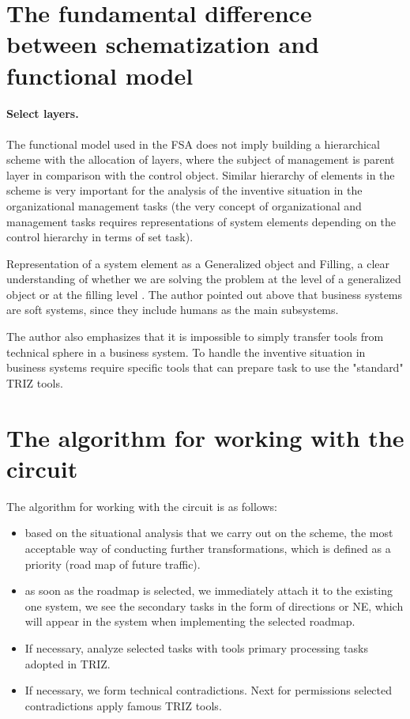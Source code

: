 \section{The fundamental difference between schematization and functional
  model}

\paragraph{Select layers.}
The functional model used in the FSA does not imply building a hierarchical
scheme with the allocation of layers, where the subject of management is
parent layer in comparison with the control object. Similar hierarchy of
elements in the scheme is very important for the analysis of the inventive
situation in the organizational management tasks (the very concept of
organizational and management tasks requires representations of system
elements depending on the control hierarchy in terms of set task).

Representation of a system element as a Generalized object and Filling, a
clear understanding of whether we are solving the problem at the level of a
generalized object or at the filling level . The author pointed out above that
business systems are soft systems, since they include humans as the main
subsystems.

The author also emphasizes that it is impossible to simply transfer tools from
technical sphere in a business system. To handle the inventive situation in
business systems require specific tools that can prepare task to use the
"standard" TRIZ tools.

\section{The algorithm for working with the circuit}
The algorithm for working with the circuit is as follows:
\begin{itemize}
\item based on the situational analysis that we carry out on the scheme, the
  most acceptable way of conducting further transformations, which is defined
  as a priority (road map of future traffic).
\item as soon as the roadmap is selected, we immediately attach it to the
  existing one system, we see the secondary tasks in the form of directions or
  NE, which will appear in the system when implementing the selected roadmap.
\item If necessary, analyze selected tasks with tools primary processing tasks
  adopted in TRIZ.
\item If necessary, we form technical contradictions. Next for permissions
  selected contradictions apply famous TRIZ tools.
\end{itemize}

